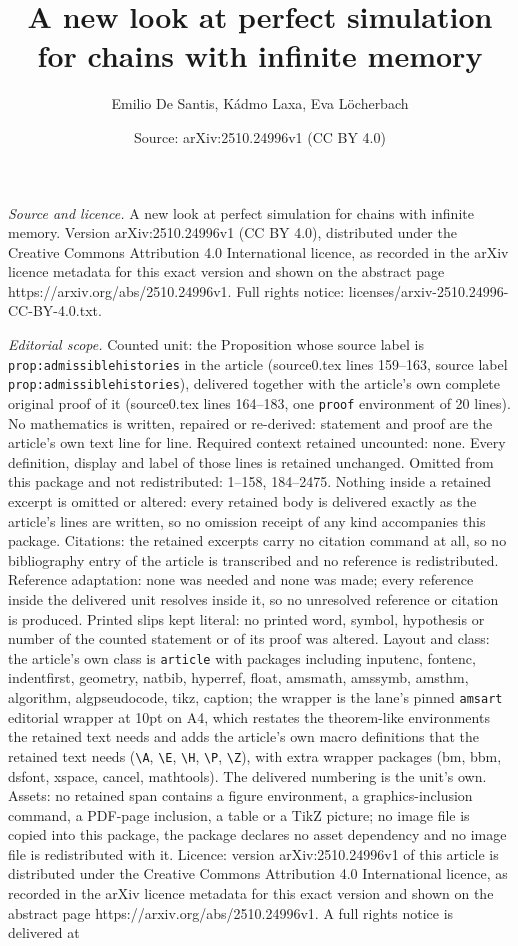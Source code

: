 \documentclass[10pt,a4paper]{amsart}
\title[A new look at perfect simulation for chains with infinite me]{A new look at perfect simulation for chains with infinite memory}
\author{Emilio De Santis, K\'admo Laxa, Eva L\"ocherbach}
\date{Source: arXiv:2510.24996v1 (CC BY 4.0)}
\begin{document}
\maketitle

\noindent\emph{Source and licence.} A new look at perfect simulation for chains with infinite memory. Version arXiv:2510.24996v1 (CC BY 4.0), distributed under the Creative Commons Attribution 4.0 International licence, as recorded in the arXiv licence metadata for this exact version and shown on the abstract page https://arxiv.org/abs/2510.24996v1. Full rights notice: licenses/arxiv-2510.24996-CC-BY-4.0.txt.\par\smallskip

\noindent\textit{Editorial scope.} Counted unit: the Proposition whose source label is \texttt{prop:admissiblehistories} in the article (source0.tex lines 159--163, source label \texttt{prop:admissiblehistories}), delivered together with the article's own complete original proof of it (source0.tex lines 164--183, one \texttt{proof} environment of 20 lines). No mathematics is written, repaired or re-derived: statement and proof are the article's own text line for line. Required context retained uncounted: none. Every definition, display and label of those lines is retained unchanged. Omitted from this package and not redistributed: 1--158, 184--2475. Nothing inside a retained excerpt is omitted or altered: every retained body is delivered exactly as the article's lines are written, so no omission receipt of any kind accompanies this package. Citations: the retained excerpts carry no citation command at all, so no bibliography entry of the article is transcribed and no reference is redistributed. Reference adaptation: none was needed and none was made; every reference inside the delivered unit resolves inside it, so no unresolved reference or citation is produced. Printed slips kept literal: no printed word, symbol, hypothesis or number of the counted statement or of its proof was altered. Layout and class: the article's own class is \texttt{article} with packages including inputenc, fontenc, indentfirst, geometry, natbib, hyperref, float, amsmath, amssymb, amsthm, algorithm, algpseudocode, tikz, caption; the wrapper is the lane's pinned \texttt{amsart} editorial wrapper at 10pt on A4, which restates the theorem-like environments the retained text needs and adds the article's own macro definitions that the retained text needs (\texttt{\textbackslash A}, \texttt{\textbackslash E}, \texttt{\textbackslash H}, \texttt{\textbackslash P}, \texttt{\textbackslash Z}), with extra wrapper packages (bm, bbm, dsfont, xspace, cancel, mathtools). The delivered numbering is the unit's own. Assets: no retained span contains a figure environment, a graphics-inclusion command, a PDF-page inclusion, a table or a TikZ picture; no image file is copied into this package, the package declares no asset dependency and no image file is redistributed with it. Licence: version arXiv:2510.24996v1 of this article is distributed under the Creative Commons Attribution 4.0 International licence, as recorded in the arXiv licence metadata for this exact version and shown on the abstract page https://arxiv.org/abs/2510.24996v1. A full rights notice is delivered at 
\end{document}

